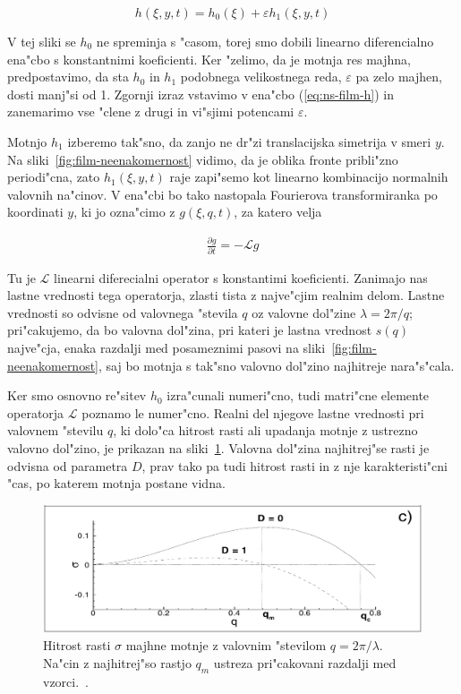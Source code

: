 \documentclass[a4paper,10pt]{article}
\newcommand{\eps}{\varepsilon}
\newcommand{\odv}[1]{\frac{\partial #1}{\partial t}}
\begin{document}
\begin{equation}
 h(\xi, y, t) = h_0(\xi) + \eps h_1(\xi, y, t)
\end{equation}

V tej sliki se $h_0$ ne spreminja s "casom, torej smo dobili linearno diferencialno ena"cbo s konstantnimi koeficienti. Ker "zelimo, da je motnja res majhna, predpostavimo, da sta $h_0$ in $h_1$ podobnega velikostnega reda, $\eps$ pa zelo majhen, dosti manj"si od 1. Zgornji izraz vstavimo v ena"cbo (\ref{eq:ns-film-h}) in zanemarimo vse "clene z drugi in vi"sjimi potencami $\eps$. 

Motnjo $h_1$ izberemo tak"sno, da zanjo ne dr"zi translacijska simetrija v smeri $y$. Na sliki~\ref{fig:film-neenakomernost} vidimo, da je oblika fronte pribli"zno periodi"cna, zato $h_1(\xi, y, t)$ raje zapi"semo kot linearno kombinacijo normalnih valovnih na"cinov. V ena"cbi bo tako nastopala Fourierova transformiranka po koordinati $y$, ki jo ozna"cimo z $g(\xi, q, t)$, za katero velja

\begin{align}
 \odv{g} = -\mathcal{L}g
\end{align}

Tu je $\mathcal{L}$ linearni diferecialni operator s konstantimi koeficienti. Zanimajo nas lastne vrednosti tega operatorja, zlasti tista z najve"cjim realnim delom. Lastne vrednosti so odvisne od valovnega "stevila $q$ oz valovne dol"zine $\lambda = 2\pi/q$; pri"cakujemo, da bo valovna dol"zina, pri kateri je lastna vrednost $s(q)$ najve"cja, enaka razdalji med posameznimi pasovi na sliki~\ref{fig:film-neenakomernost}, saj bo motnja s tak"sno valovno dol"zino najhitreje nara"s"cala. 

Ker smo osnovno re"sitev $h_0$ izra"cunali numeri"cno, tudi matri"cne elemente operatorja $\mathcal{L}$ poznamo le numer"cno. Realni del njegove lastne vrednosti pri valovnem "stevilu $q$, ki dolo"ca hitrost rasti ali upadanja motnje z ustrezno valovno dol"zino, je prikazan na sliki~\ref{fig:film-rast}. Valovna dol"zina najhitrej"se rasti je odvisna od parametra $D$, prav tako pa tudi hitrost rasti in z nje karakteristi"cni "cas, po katerem motnja postane vidna. 

\begin{figure}[h]
 \centering
 \includegraphics[width=.8\textwidth]{./Slike/film-stabilnost}
 \caption{Hitrost rasti $\sigma$ majhne motnje z valovnim "stevilom $q=2\pi/\lambda$. Na"cin z najhitrej"so rastjo $q_m$ ustreza pri"cakovani razdalji med vzorci.~\cite{kondic}. }
 \label{fig:film-rast}
\end{figure}
\end{document}
